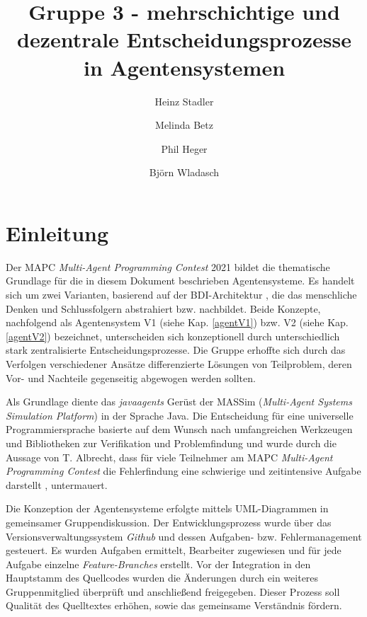 \documentclass[runningheads]{llncs}
\begin{document}
%
\title{Gruppe 3 - mehrschichtige und dezentrale Entscheidungsprozesse in Agentensystemen}
%
%
\author{Heinz Stadler\and
Melinda Betz\and
Phil Heger\and
Björn Wladasch}
%
%
%
\maketitle              %
%
%
\section{Einleitung}
Der MAPC \textit{Multi-Agent Programming Contest} 2021\cite{MAPC2021} bildet die thematische Grundlage für die in diesem Dokument beschrieben Agentensysteme. Es handelt sich um zwei Varianten, basierend auf der BDI-Architektur \cite{Bratman1987}, die das menschliche Denken und Schlussfolgern abstrahiert bzw. nachbildet. Beide Konzepte, nachfolgend als Agentensystem V1 (siehe Kap. \ref{agentV1}) bzw. V2 (siehe Kap. \ref{agentV2}) bezeichnet, unterscheiden sich konzeptionell durch unterschiedlich stark zentralisierte Entscheidungsprozesse.
Die Gruppe erhoffte sich durch das Verfolgen verschiedener Ansätze differenzierte Lösungen von Teilproblem, deren Vor- und Nachteile gegenseitig abgewogen werden sollten.


Als Grundlage diente das \textit{javaagents} Gerüst der MASSim (\textit{Multi-Agent Systems Simulation Platform}) \cite{EISMASSim} in der Sprache Java. Die Entscheidung für eine universelle Programmiersprache basierte auf dem Wunsch nach umfangreichen Werkzeugen und Bibliotheken zur Verifikation und Problemfindung und wurde durch die Aussage von T. Albrecht, dass für viele Teilnehmer am MAPC \textit{Multi-Agent Programming Contest} die Fehlerfindung eine schwierige und zeitintensive Aufgabe darstellt \cite[S. 17]{Ahlbrecht2021}, untermauert.

Die Konzeption der Agentensysteme erfolgte mittels UML-Diagrammen in gemeinsamer Gruppendiskussion.
Der Entwicklungsprozess wurde über das Versionsverwaltungssystem \textit{Github} und dessen Aufgaben- bzw. Fehlermanagement gesteuert. Es wurden Aufgaben ermittelt, Bearbeiter zugewiesen und für jede Aufgabe einzelne \textit{Feature-Branches} erstellt. Vor der Integration in den Hauptstamm des Quellcodes wurden die Änderungen durch ein weiteres Gruppenmitglied überprüft und anschließend freigegeben. Dieser Prozess soll Qualität des Quelltextes erhöhen, sowie das gemeinsame Verständnis fördern.
\end{document}
